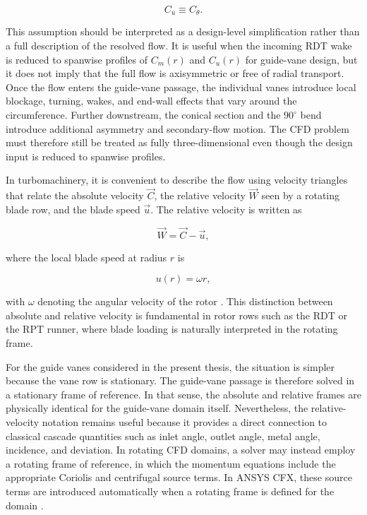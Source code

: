 \begin{equation}
C_u \equiv C_\theta.
\end{equation}

This assumption should be interpreted as a design-level simplification rather than a full description of the resolved flow. It is useful when the incoming RDT wake is reduced to spanwise profiles of \(C_m(r)\) and \(C_u(r)\) for guide-vane design, but it does not imply that the full flow is axisymmetric or free of radial transport. Once the flow enters the guide-vane passage, the individual vanes introduce local blockage, turning, wakes, and end-wall effects that vary around the circumference. Further downstream, the conical section and the \(90^\circ\) bend introduce additional asymmetry and secondary-flow motion. The CFD problem must therefore still be treated as fully three-dimensional even though the design input is reduced to spanwise profiles.

In turbomachinery, it is convenient to describe the flow using velocity triangles that relate the absolute velocity \(\vec{C}\), the relative velocity \(\vec{W}\) seen by a rotating blade row, and the blade speed \(\vec{u}\). The relative velocity is written as

\begin{equation}
\vec{W} = \vec{C} - \vec{u},
\end{equation}

where the local blade speed at radius \(r\) is

\begin{equation}
u(r)=\omega r,
\end{equation}

with \(\omega\) denoting the angular velocity of the rotor \cite{DixonHall2014}. This distinction between absolute and relative velocity is fundamental in rotor rows such as the RDT or the RPT runner, where blade loading is naturally interpreted in the rotating frame.

For the guide vanes considered in the present thesis, the situation is simpler because the vane row is stationary. The guide-vane passage is therefore solved in a stationary frame of reference. In that sense, the absolute and relative frames are physically identical for the guide-vane domain itself. Nevertheless, the relative-velocity notation remains useful because it provides a direct connection to classical cascade quantities such as inlet angle, outlet angle, metal angle, incidence, and deviation. In rotating CFD domains, a solver may instead employ a rotating frame of reference, in which the momentum equations include the appropriate Coriolis and centrifugal source terms. In ANSYS CFX, these source terms are introduced automatically when a rotating frame is defined for the domain \cite{AnsysCFXRotatingFrames2024}.

